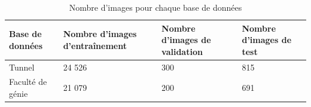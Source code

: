     \begin{table}
        \centering
        \caption{Nombre d'images pour chaque base de données}
        \label{tab:nb_image_bd}
        \begin{tabular}{p{4cm}p{3cm}p{2.25cm}p{2.25cm}}
            \midrule
            Base de données &  Nombre d'images d'entraînement & Nombre d'images de validation & Nombre d'images de test\\
            \midrule\midrule
            Tunnel & 24 526 & 300 & 815\\
            Faculté de génie & 21 079 & 200 & 691\\
            \midrule
        \end{tabular}
    \end{table}
